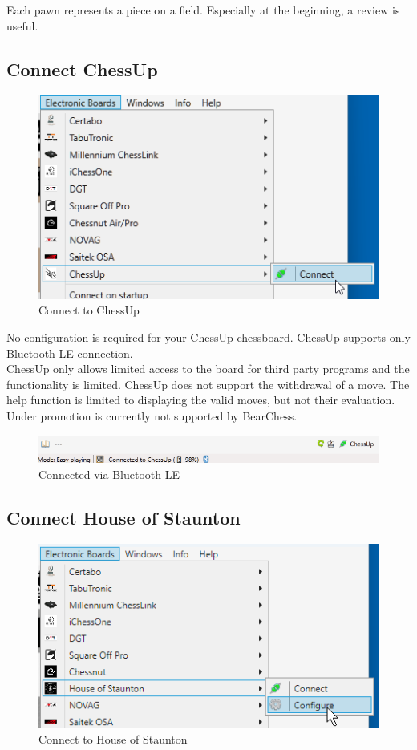 \documentclass[11pt,a4paper]{article}
\begin{document}
Each pawn represents a piece on a field. Especially at the beginning, a review is useful. 

\subsection{Connect ChessUp} \label{ConnectChessUp}
\begin{figure}[H]
	\centering
	\includegraphics[scale=1.0]{ChessUp1.png}
	\caption{Connect to ChessUp }
	\label{fig:ChessUp1}
\end{figure}

No configuration is required for your ChessUp chessboard. ChessUp supports only Bluetooth LE connection.\\ 
ChessUp only allows limited access to the board for third party programs and the functionality is limited. ChessUp does not support the withdrawal of a move. The help function is limited to displaying the valid moves, but not their evaluation. Under promotion is currently not supported by BearChess.\\

\begin{figure}[H]
	\centering
	\includegraphics[scale=0.7]{ChessUp2.png}
	\caption{Connected via Bluetooth LE}
	\label{fig:ChessUp2}
\end{figure}


\subsection{Connect House of Staunton} \label{ConnectHOS}
\begin{figure}[H]
	\centering
	\includegraphics[scale=1.0]{HOS1.png}
	\caption{Connect to House of Staunton }
	\label{fig:HOS1}
\end{figure}
\end{document}
